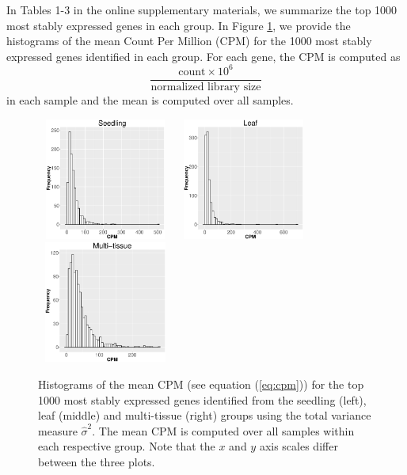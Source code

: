 \documentclass[letterpaper,12pt]{article}
\begin{document}
In Tables 1-3 in the online supplementary materials, we summarize the
top 1000 most stably expressed genes in each group.  In Figure \ref{cpm}, we
provide the histograms of the mean Count Per Million (CPM) for the 1000
most stably expressed genes identified in each group. For each gene, the CPM
is computed as
\begin{equation}\label{eq:cpm}
 \dfrac{ \text{count} \times 10^6 }{ \text{normalized library size}} 
\end{equation}
in each sample and the mean is computed over all samples.
 
\begin{figure}[tbp] \begin{center}
    \includegraphics[width=4.5cm,height=4cm]{Figures/cpm_seedling.eps}
    \includegraphics[width=4.5cm,height=4cm]{Figures/cpm_leaves.eps}
    \includegraphics[width=4.5cm,height=4cm]{Figures/cpm_tissue.eps}
    \caption{{\small{\label{cpm} 
    Histograms of the mean CPM (see equation (\ref{eq:cpm})) for the top 1000
    most stably expressed genes identified from the seedling (left), leaf (middle) and multi-tissue
    (right) groups
    using  the total variance measure $\hat{\sigma}^2$}}. 
    The mean CPM is computed over all samples within each respective group. Note that the $x$ and $y$ axis scales differ between the three plots.
    } \end{center} 
\end{figure} 
\end{document}
